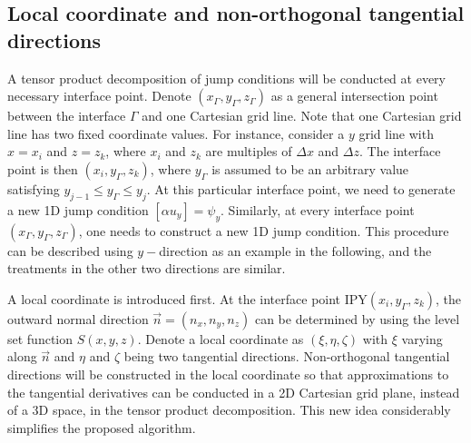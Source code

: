 \documentclass[dissertation]{uathesis}
\begin{document}
\begin{body}
\subsection{Local coordinate and non-orthogonal tangential directions}
A tensor product decomposition of jump conditions will be conducted at every necessary interface point. 
Denote $(x_{\Gamma},y_{\Gamma},z_{\Gamma})$ as a general intersection point between the interface $\Gamma$ and one Cartesian grid line. 
Note that one Cartesian grid line has two fixed coordinate values. For instance, consider a $y$ grid line with $x=x_i$ and $z=z_k$, where $x_i$ and $z_k$ are multiples of $\Delta x$ and $\Delta z$. 
The interface point is then  $(x_{i},y_{\Gamma},z_{k})$, where $y_{\Gamma}$ is assumed to be an arbitrary value satisfying $y_{j-1} \le y_{\Gamma} \le y_{j}$. 
At this particular interface point, we need to generate a new 1D jump condition $[\alpha u_y]=\psi_y$. 
Similarly, at every interface point $(x_{\Gamma},y_{\Gamma},z_{\Gamma})$, one needs to construct a new 1D jump condition. This procedure can be described using $y-$direction as an example in the following, and the treatments in the other two directions are similar. 

A local coordinate is introduced first. At the interface point IPY$(x_{i},y_{\Gamma},z_{k})$, the outward normal direction $\vec{n}=(n_x,n_y,n_z)$ can be determined by using the level set function $S(x,y,z)$. 
Denote a local coordinate as $(\xi, \eta, \zeta)$ with $\xi$ varying along $\vec{n}$
and $\eta$ and $\zeta$ being two tangential directions. 
Non-orthogonal tangential directions will be constructed in the local coordinate so that approximations
to the tangential derivatives can be conducted in a 2D Cartesian grid plane, 
instead of a 3D space, in the tensor 
product decomposition. This new idea considerably simplifies the proposed algorithm. 


\end{body}
\end{document}

